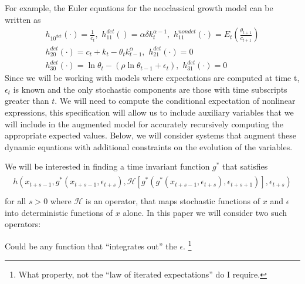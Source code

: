 \documentclass[12pt]{article}
\begin{document}
For example, the Euler equations for the  neoclassical growth  model 
\label{sec:simple-rbc-model-ext} can be written as
\begin{gather}
h_{10^{det}}(\cdot)=\frac{1}{c_t},\,\,
h_{11}^{det}()=\alpha \delta k_{t}^{\alpha-1} ,\,\,
h_{11}^{nondet}(\cdot)=E_t \left (\frac{\theta_{t+1}}{c_{t+1}} \right )\\
h_{20}^{det}(\cdot)=c_t + k_t-\theta_tk_{t-1}^\alpha,\,\,
h_{21}^{det}(\cdot)=0\\
h_{30}^{det}(\cdot)=\ln \theta_t -(\rho \ln \theta_{t-1} + \epsilon_t),\,\,
h_{31}^{det}(\cdot)=0
\end{gather}
Since we will be working with models where expectations are computed at time t, $\epsilon_t$ is known and the only stochastic components are those with time subscripts greater than $t$. We will need to compute 
the conditional expectation of nonlinear expressions,  
this specification will allow us to include auxiliary
variables that we will include in the augmented model for 
accurately recursively computing  the appropriate expected values.
Below, we will consider 
systems that augment these dynamic equations with additional constraints 
on the evolution of the variables.


We will be interested in
finding a time invariant function $g^\ast$ that satisfies
\begin{gather}
  \begin{split}
h(x_{t+s-1},g^\ast(x_{t+s-1},\epsilon_{t+s}),\mathcal{H}[g^\ast(g^\ast(x_{t+s-1},\epsilon_{t+s}),\epsilon_{t+s+1})],\epsilon_{t+s}) \label{theProblem} \\
  \end{split}
 \end{gather}
 for all $s>0$ where $\mathcal{H}$ is an operator, 
  that maps stochastic functions of $x$ and $\epsilon$ into deterministic 
functions of $x$ alone.  In this paper we will consider two such operators:



Could be any function that ``integrates out'' the $\epsilon$.
\footnote{What property, not the ``law of iterated expectations'' do I require.}
\end{document}
